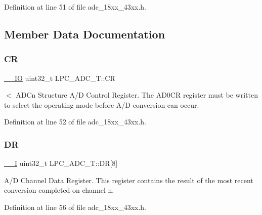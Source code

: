 Definition at line 51 of file adc\+\_\+18xx\+\_\+43xx.\+h.



\subsection{Member Data Documentation}
\mbox{\label{struct_l_p_c___a_d_c___t_a751f1cbdd3d5242aea596dc18113fedc}} 
\subsubsection{\texorpdfstring{CR}{CR}}
{\footnotesize\ttfamily \hyperlink{core__sc300_8h_aec43007d9998a0a0e01faede4133d6be}{\+\_\+\+\_\+\+IO} uint32\+\_\+t L\+P\+C\+\_\+\+A\+D\+C\+\_\+\+T\+::\+CR}

$<$ A\+D\+Cn Structure A/D Control Register. The A\+D0\+CR register must be written to select the operating mode before A/D conversion can occur. 

Definition at line 52 of file adc\+\_\+18xx\+\_\+43xx.\+h.

\mbox{\label{struct_l_p_c___a_d_c___t_a10f521f172d10766bb189be671f8bd57}} 
\subsubsection{\texorpdfstring{DR}{DR}}
{\footnotesize\ttfamily \hyperlink{core__sc300_8h_af63697ed9952cc71e1225efe205f6cd3}{\+\_\+\+\_\+I} uint32\+\_\+t L\+P\+C\+\_\+\+A\+D\+C\+\_\+\+T\+::\+DR\mbox{[}8\mbox{]}}

A/D Channel Data Register. This register contains the result of the most recent conversion completed on channel n. 

Definition at line 56 of file adc\+\_\+18xx\+\_\+43xx.\+h.

\mbox{\label{struct_l_p_c___a_d_c___t_a063e42ec8fcdcf5590579a8d1a888ca0}} 
